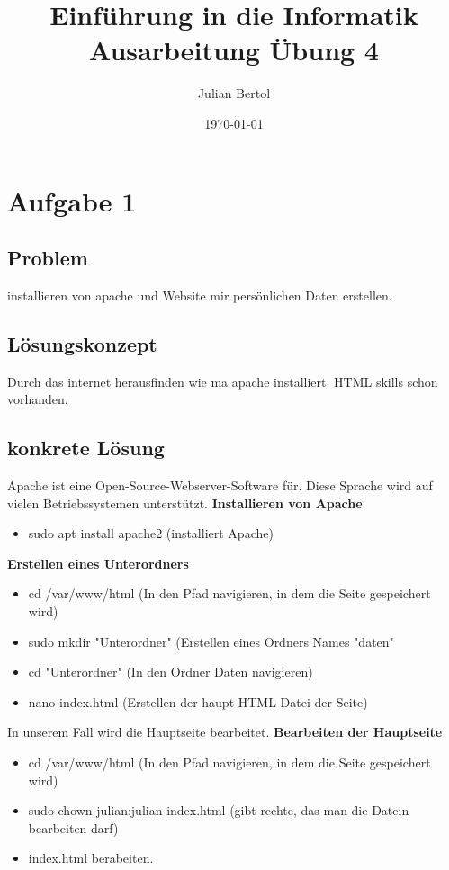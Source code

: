 \documentclass[a4paper,11pt,titlepage]{article}
\begin{document}
\title{Einf\"uhrung in die Informatik\\
Ausarbeitung \"Ubung 4}


\author{Julian Bertol}


\date{\today}

\maketitle{\thispagestyle{plain}}

\section{Aufgabe 1}

\subsection{Problem}
installieren von apache und Website mir pers\"onlichen Daten erstellen.
\subsection{L\"osungskonzept}
Durch das internet herausfinden wie ma apache installiert. HTML skills schon vorhanden.
\subsection{konkrete L\"osung}
Apache ist eine Open-Source-Webserver-Software f\"ur. \newline
Diese Sprache wird auf vielen Betriebssystemen unterst\"utzt. \newline
\textbf{Installieren von Apache}
\begin{itemize}
  \item sudo apt install apache2 (installiert Apache)
\end{itemize}
\textbf{Erstellen eines Unterordners}
\begin{itemize}
  \item cd /var/www/html (In den Pfad navigieren, in dem die Seite gespeichert wird)
  \item sudo mkdir "Unterordner" (Erstellen eines Ordners Names "daten"
  \item cd "Unterordner"         (In den Ordner Daten navigieren)
  \item nano index.html  (Erstellen der haupt HTML Datei der Seite)
\end{itemize}
In unserem Fall wird die Hauptseite bearbeitet. \newline
\textbf{Bearbeiten der Hauptseite}
\begin{itemize}
  \item cd /var/www/html (In den Pfad navigieren, in dem die Seite gespeichert wird)
  \item sudo chown julian:julian index.html (gibt rechte, das man die Datein bearbeiten darf)
  \item index.html berabeiten.
\end{itemize}
\end{document}

